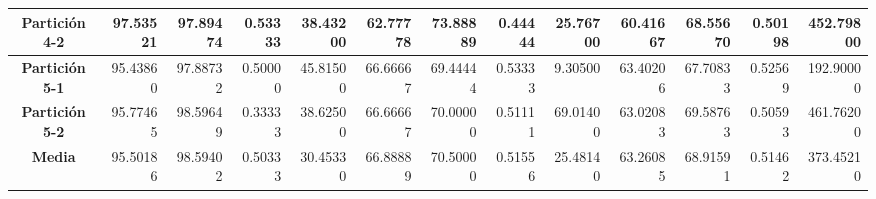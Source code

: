 \documentclass[a4paper,11pt]{article}
\begin{document}
\begin{table}[htbp]
\begin{adjustbox}{width=1.1\textwidth}
\begin{tabular}{|c|r|r|r|r|r|r|r|r|r|r|r|r|}
    \textbf{Partición 4-2} & 97.53521 & 97.89474 & 0.53333 & 38.43200 & 62.77778 & 73.88889 & 0.44444 & 25.76700 & 60.41667 & 68.55670 & 0.50198 & 452.79800 \\ \hline
    \textbf{Partición 5-1} & 95.43860 & 97.88732 & 0.50000 & 45.81500 & 66.66667 & 69.44444 & 0.53333 & 9.30500 & 63.40206 & 67.70833 & 0.52569 & 192.90000 \\ \hline
    \textbf{Partición 5-2} & 95.77465 & 98.59649 & 0.33333 & 38.62500 & 66.66667 & 70.00000 & 0.51111 & 69.01400 & 63.02083 & 69.58763 & 0.50593 & 461.76200 \\ \hline
    \textbf{Media} & 95.50186 & 98.59402 & 0.50333 & 30.45330 & 66.88889 & 70.50000 & 0.51556 & 25.48140 & 63.26085 & 68.91591 & 0.51462 & 373.45210 \\ \hline
    \end{tabular}
    \end{adjustbox}
    \label{ES}
  \end{table}  
\end{document}
